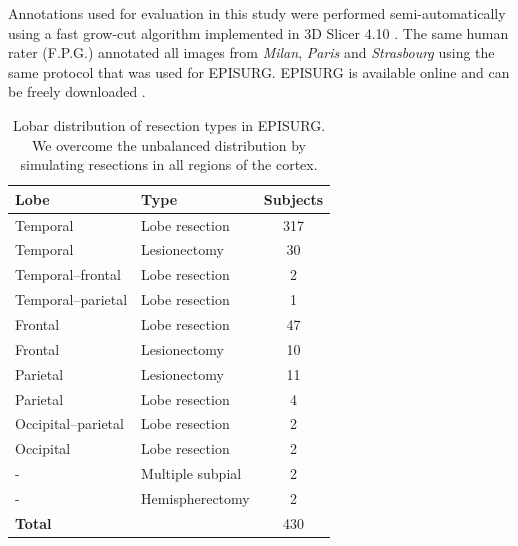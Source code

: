 Annotations used for evaluation in this study were performed semi-automatically using a fast grow-cut algorithm implemented in 3D Slicer 4.10 \cite{zhu_effective_2014,fedorov_3d_2012}.
The same human rater (F.P.G.) annotated all images from \textit{Milan}, \textit{Paris} and \textit{Strasbourg} using the same protocol that was used for EPISURG.
EPISURG is available online and can be freely downloaded \cite{perez-garcia_episurg_2020}%
.


\begin{table}
  \centering
  \setlength{\tabcolsep}{12pt}
  \caption[Lobar distribution of resection types in EPISURG]{
    Lobar distribution of resection types in EPISURG.
    We overcome the unbalanced distribution by simulating resections in all regions of the cortex.
  }
  \label{tab:episurg}
  \begin{tabular}{llS[table-format=3.0]}
    \toprule
    \textbf{Lobe}       & \textbf{Type}    & \textbf{Subjects} \\
    \midrule
    Temporal            & Lobe resection   &        317 \\
    Temporal            & Lesionectomy     &         30 \\
    Temporal--frontal   & Lobe resection   &          2 \\
    Temporal--parietal  & Lobe resection   &          1 \\
    Frontal             & Lobe resection   &         47 \\
    Frontal             & Lesionectomy     &         10 \\
    Parietal            & Lesionectomy     &         11 \\
    Parietal            & Lobe resection   &          4 \\
    Occipital--parietal & Lobe resection   &          2 \\
    Occipital           & Lobe resection   &          2 \\
    -                   & Multiple subpial &          2 \\
    -                   & Hemispherectomy  &          2 \\
    \midrule
    \textbf{Total}      &                  &        430 \\
    \bottomrule
  \end{tabular}
\end{table}



